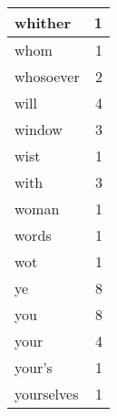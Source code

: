 \begin{center}
\begin{longtable}{l|r}
whither & 1 \\ \hline
whom & 1 \\ \hline
whosoever & 2 \\ \hline
will & 4 \\ \hline
window & 3 \\ \hline
wist & 1 \\ \hline
with & 3 \\ \hline
woman & 1 \\ \hline
words & 1 \\ \hline
wot & 1 \\ \hline
ye & 8 \\ \hline
you & 8 \\ \hline
your & 4 \\ \hline
your's & 1 \\ \hline
yourselves & 1 \\ \hline
\end{longtable}
\end{center}



\normalsize



